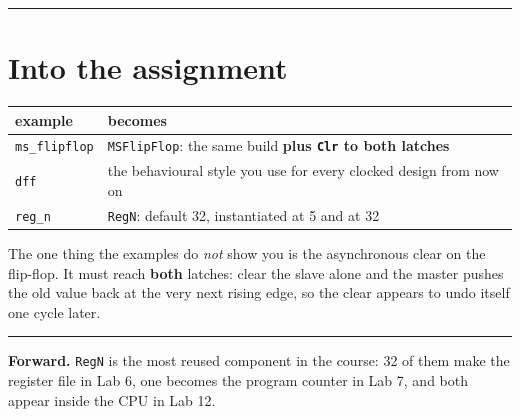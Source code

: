 \documentclass[11pt]{article}
\newcommand{\code}[1]{\texttt{#1}}
\newcommand{\hr}{\vspace{2pt}\hrule\vspace{6pt}}
\begin{document}
\vspace{4pt}\hr

\section*{Into the assignment}

\begin{center}
\begin{tabular}{ll}
\toprule
example & becomes \\
\midrule
\code{ms\_flipflop} & \code{MSFlipFlop}: the same build \textbf{plus \code{Clr} to both latches} \\
\code{dff} & the behavioural style you use for every clocked design from now on \\
\code{reg\_n} & \code{RegN}: default 32, instantiated at 5 and at 32 \\
\bottomrule
\end{tabular}
\end{center}

The one thing the examples do \emph{not} show you is the asynchronous clear on the
flip-flop. It must reach \textbf{both} latches: clear the slave alone and the
master pushes the old value back at the very next rising edge, so the clear
appears to undo itself one cycle later.

\vspace{6pt}
\hr
{\small \textbf{Forward.} \code{RegN} is the most reused component in the course:
32 of them make the register file in Lab 6, one becomes the program counter in
Lab 7, and both appear inside the CPU in Lab 12.}
\end{document}
